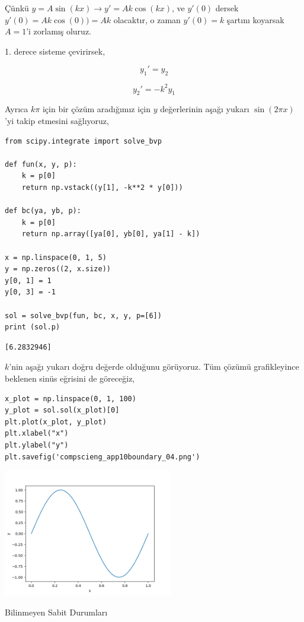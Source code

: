 \documentclass[12pt,fleqn]{article}\usepackage{../../common}
\begin{document}
Çünkü $y=A\sin(kx) \to y' = A k \cos(kx)$, ve $y'(0)$ dersek
$y'(0) = A k \cos(0)) = A k$ olacaktır, o zaman $y'(0) = k$ şartını
koyarsak $A=1$'i zorlamış oluruz. 

1. derece sisteme çevirirsek,

$$
y_1' = y_2
$$

$$
y_2' = -k^2 y_1
$$

Ayrıca $k\pi$ için bir çözüm aradığımız için $y$ değerlerinin aşağı yukarı
$\sin(2\pi x)$'yi takip etmesini sağlıyoruz,

\begin{verbatim}
from scipy.integrate import solve_bvp

def fun(x, y, p):
    k = p[0]
    return np.vstack((y[1], -k**2 * y[0]))

def bc(ya, yb, p):
    k = p[0]
    return np.array([ya[0], yb[0], ya[1] - k])

x = np.linspace(0, 1, 5)
y = np.zeros((2, x.size))
y[0, 1] = 1
y[0, 3] = -1

sol = solve_bvp(fun, bc, x, y, p=[6])
print (sol.p)
\end{verbatim}

\begin{verbatim}
[6.2832946]
\end{verbatim}

$k$'nin aşağı yukarı doğru değerde olduğunu görüyoruz. Tüm çözümü
grafikleyince beklenen sinüs eğrisini de göreceğiz, 

\begin{verbatim}
x_plot = np.linspace(0, 1, 100)
y_plot = sol.sol(x_plot)[0]
plt.plot(x_plot, y_plot)
plt.xlabel("x")
plt.ylabel("y")
plt.savefig('compscieng_app10boundary_04.png')
\end{verbatim}

\includegraphics[width=20em]{compscieng_app10boundary_04.png}

Bilinmeyen Sabit Durumları
\end{document}
